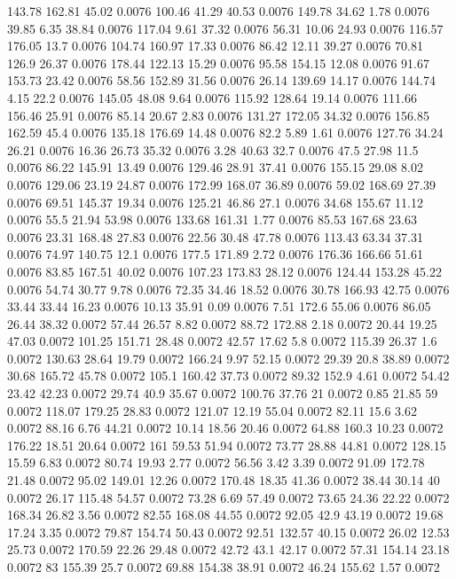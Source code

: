 143.78	162.81	45.02	0.0076
100.46	41.29	40.53	0.0076
149.78	34.62	1.78	0.0076
39.85	6.35	38.84	0.0076
117.04	9.61	37.32	0.0076
56.31	10.06	24.93	0.0076
116.57	176.05	13.7	0.0076
104.74	160.97	17.33	0.0076
86.42	12.11	39.27	0.0076
70.81	126.9	26.37	0.0076
178.44	122.13	15.29	0.0076
95.58	154.15	12.08	0.0076
91.67	153.73	23.42	0.0076
58.56	152.89	31.56	0.0076
26.14	139.69	14.17	0.0076
144.74	4.15	22.2	0.0076
145.05	48.08	9.64	0.0076
115.92	128.64	19.14	0.0076
111.66	156.46	25.91	0.0076
85.14	20.67	2.83	0.0076
131.27	172.05	34.32	0.0076
156.85	162.59	45.4	0.0076
135.18	176.69	14.48	0.0076
82.2	5.89	1.61	0.0076
127.76	34.24	26.21	0.0076
16.36	26.73	35.32	0.0076
3.28	40.63	32.7	0.0076
47.5	27.98	11.5	0.0076
86.22	145.91	13.49	0.0076
129.46	28.91	37.41	0.0076
155.15	29.08	8.02	0.0076
129.06	23.19	24.87	0.0076
172.99	168.07	36.89	0.0076
59.02	168.69	27.39	0.0076
69.51	145.37	19.34	0.0076
125.21	46.86	27.1	0.0076
34.68	155.67	11.12	0.0076
55.5	21.94	53.98	0.0076
133.68	161.31	1.77	0.0076
85.53	167.68	23.63	0.0076
23.31	168.48	27.83	0.0076
22.56	30.48	47.78	0.0076
113.43	63.34	37.31	0.0076
74.97	140.75	12.1	0.0076
177.5	171.89	2.72	0.0076
176.36	166.66	51.61	0.0076
83.85	167.51	40.02	0.0076
107.23	173.83	28.12	0.0076
124.44	153.28	45.22	0.0076
54.74	30.77	9.78	0.0076
72.35	34.46	18.52	0.0076
30.78	166.93	42.75	0.0076
33.44	33.44	16.23	0.0076
10.13	35.91	0.09	0.0076
7.51	172.6	55.06	0.0076
86.05	26.44	38.32	0.0072
57.44	26.57	8.82	0.0072
88.72	172.88	2.18	0.0072
20.44	19.25	47.03	0.0072
101.25	151.71	28.48	0.0072
42.57	17.62	5.8	0.0072
115.39	26.37	1.6	0.0072
130.63	28.64	19.79	0.0072
166.24	9.97	52.15	0.0072
29.39	20.8	38.89	0.0072
30.68	165.72	45.78	0.0072
105.1	160.42	37.73	0.0072
89.32	152.9	4.61	0.0072
54.42	23.42	42.23	0.0072
29.74	40.9	35.67	0.0072
100.76	37.76	21	0.0072
0.85	21.85	59	0.0072
118.07	179.25	28.83	0.0072
121.07	12.19	55.04	0.0072
82.11	15.6	3.62	0.0072
88.16	6.76	44.21	0.0072
10.14	18.56	20.46	0.0072
64.88	160.3	10.23	0.0072
176.22	18.51	20.64	0.0072
161	59.53	51.94	0.0072
73.77	28.88	44.81	0.0072
128.15	15.59	6.83	0.0072
80.74	19.93	2.77	0.0072
56.56	3.42	3.39	0.0072
91.09	172.78	21.48	0.0072
95.02	149.01	12.26	0.0072
170.48	18.35	41.36	0.0072
38.44	30.14	40	0.0072
26.17	115.48	54.57	0.0072
73.28	6.69	57.49	0.0072
73.65	24.36	22.22	0.0072
168.34	26.82	3.56	0.0072
82.55	168.08	44.55	0.0072
92.05	42.9	43.19	0.0072
19.68	17.24	3.35	0.0072
79.87	154.74	50.43	0.0072
92.51	132.57	40.15	0.0072
26.02	12.53	25.73	0.0072
170.59	22.26	29.48	0.0072
42.72	43.1	42.17	0.0072
57.31	154.14	23.18	0.0072
83	155.39	25.7	0.0072
69.88	154.38	38.91	0.0072
46.24	155.62	1.57	0.0072
